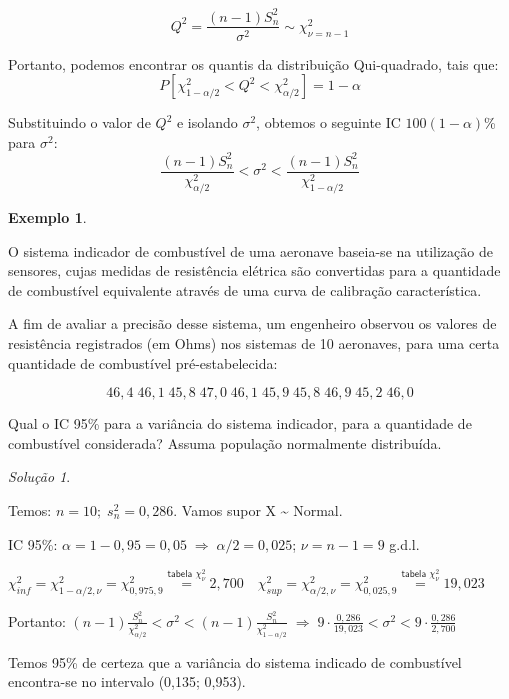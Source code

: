\documentclass[
]{book}
\theoremstyle{definition}
\theoremstyle{definition}
\newtheorem{example}{Exemplo}[chapter]
\theoremstyle{definition}
\theoremstyle{remark}
\newtheorem*{solution}{Solução}
\begin{document}
\[Q^2 = \frac{(n-1) S^2_n}{\sigma^2} \sim \chi^2_{\nu=n-1}\]

Portanto, podemos encontrar os quantis da distribuição Qui-quadrado, tais que:
\[P[\chi^2_{1-\alpha/2} < Q^2 < \chi^2_{\alpha/2}]  = 1-\alpha\]

Substituindo o valor de \(Q^2\) e isolando \(\sigma^2\), obtemos o seguinte IC \(100(1-\alpha)\)\% para \(\sigma^2\):
\[\frac{(n-1)S^2_n}{\chi^2_{\alpha/2}} < \sigma^2 < \frac{(n-1)S^2_n}{\chi^2_{1-\alpha/2}}\]

\begin{example}
\protect\hypertarget{exm:unnamed-chunk-12}{}{\label{exm:unnamed-chunk-12} }
\end{example}

O sistema indicador de combustível de uma aeronave baseia-se na utilização de sensores, cujas medidas de resistência elétrica são convertidas para a quantidade de combustível equivalente através de uma curva de calibração característica.

A fim de avaliar a precisão desse sistema, um engenheiro observou os valores de resistência registrados (em Ohms) nos sistemas de 10 aeronaves, para uma certa quantidade de combustível pré-estabelecida:

\[46,4\; 46,1\; 45,8\; 47,0\; 46,1\; 45,9\; 45,8\; 46,9\; 45,2\; 46,0\]

Qual o IC 95\% para a variância do sistema indicador, para a quantidade de combustível considerada?
Assuma população normalmente distribuída.

\begin{solution}
{}
\end{solution}

Temos: \(n = 10; \; s_n^2 = 0,286\). Vamos supor X \textasciitilde{} Normal.

IC 95\%: \(\alpha = 1 - 0,95 = 0,05 \; \Rightarrow \; \alpha/2 = 0,025\); \(\nu = n- 1 = 9\) g.d.l.

\(\chi^2_{inf} = \chi^2_{1- \alpha/2, \nu}= \chi^2_{0,975, 9} \overset{\textsf{tabela }\chi^2_{\nu}}{=} 2,700 \quad \chi^2_{sup} = \chi^2_{\alpha/2, \nu} = \chi^2_{0,025, 9} \overset{\textsf{tabela }\chi^2_{\nu}}{=} 19,023\)

Portanto:
\((n-1)\frac{S_n^2}{\chi^2_{\alpha/2}} < \sigma^2 < (n-1)\frac{S_n^2}{\chi^2_{1-\alpha/2}} \; \Rightarrow \; 9 \cdot \frac{0,286}{19,023} < \sigma^2 < 9 \cdot \frac{0,286}{2,700}\)

Temos 95\% de certeza que a variância do sistema indicado de combustível encontra-se no intervalo (0,135; 0,953).
\end{document}
